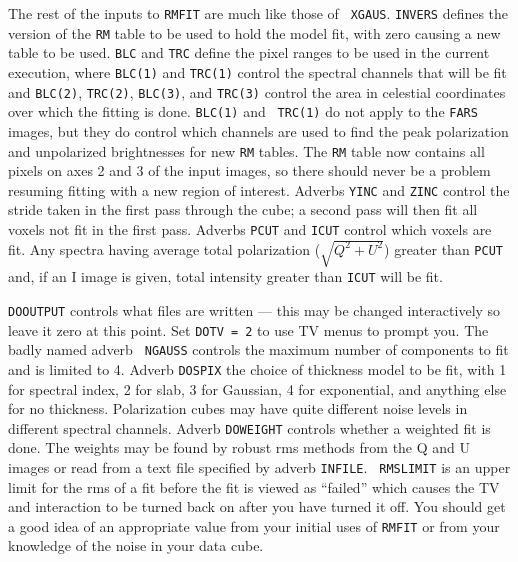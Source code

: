 \documentclass[twoside]{article}
\newcommand{\Hi}[1]{\textcolor{hicol}{#1}}
\begin{document}
The rest of the inputs to {\tt RMFIT} are much like those of {\tt
  XGAUS}\@.  {\tt INVERS} defines the version of the {\tt RM} table to
be used to hold the model fit, with zero causing a new table to be
used.  {\tt BLC} and {\tt TRC} define the pixel ranges to be used in
the current execution, where {\tt BLC(1)} and {\tt TRC(1)} control the
spectral channels that will be fit and {\tt BLC(2)}, {\tt TRC(2)},
{\tt BLC(3)}, and {\tt TRC(3)} control the area in celestial
coordinates over which the fitting is done.  {\tt BLC(1)} and {\tt
TRC(1)} do not apply to the {\tt FARS} images\Hi{, but they do control
which channels are used to find the peak polarization and unpolarized
brightnesses for new {\tt RM} tables.  The {\tt RM} table now contains
all pixels on axes 2 and 3 of the input images, so there should never
be a problem resuming fitting with a new region of interest.}  Adverbs
{\tt YINC} and {\tt ZINC} control the stride taken in the first pass
through the cube; a second pass will then fit all voxels not fit in
the first pass.  Adverbs {\tt PCUT} and {\tt ICUT} control which
voxels are fit.  Any spectra having average total polarization
($\sqrt{Q^2 + U^2}$) greater than {\tt PCUT} and, if an I image is
given, total intensity greater than {\tt ICUT} will be fit.

 {\tt DOOUTPUT} controls what files are written --- this may be
 changed interactively so leave it zero at this point.  Set {\tt DOTV
   = 2} to use TV menus to prompt you.  The badly named adverb {\tt
   NGAUSS} controls the maximum number of components to fit and is
 limited to 4.  Adverb {\tt DOSPIX} the choice of thickness model to
 be fit, with 1 for spectral index, 2 for slab, 3 for Gaussian, 4 for
 exponential, and anything else for no thickness.  Polarization cubes
 may have quite different noise levels in different spectral channels.
 Adverb {\tt DOWEIGHT} controls whether a weighted fit is done.  The
 weights may be found by robust rms methods from the Q and U images or
 read from a text file specified by adverb {\tt INFILE}\@.  {\tt
   RMSLIMIT} is an upper limit for the rms of a fit before the fit is
 viewed as ``failed'' which causes the TV and interaction to be turned
 back on after you have turned it off.  You should get a good idea of
 an appropriate value from your initial uses of {\tt RMFIT} or from
 your knowledge of the noise in your data cube.
\end{document}
